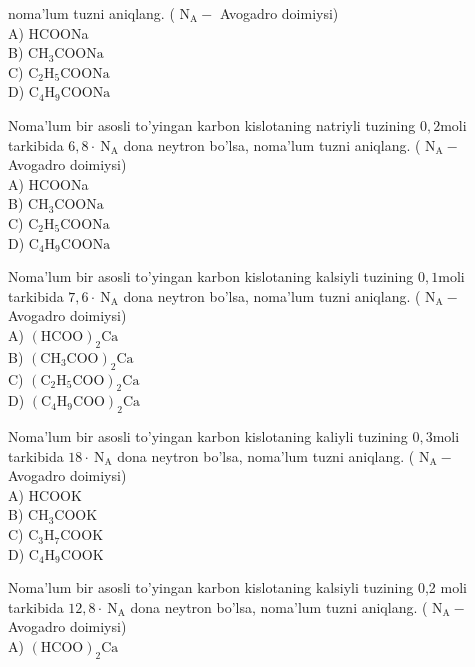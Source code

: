 noma'lum tuzni aniqlang. ( $\mathrm{N}_{\mathrm{A}}-$ Avogadro doimiysi)\\
A) HCOONa\\
B) $\mathrm{CH}_{3} \mathrm{COONa}$\\
C) $\mathrm{C}_{2} \mathrm{H}_{5} \mathrm{COONa}$\\
D) $\mathrm{C}_{4} \mathrm{H}_{9} \mathrm{COONa}$
  \item Noma'lum bir asosli to'yingan karbon kislotaning natriyli tuzining $0,2 \mathrm{moli}$ tarkibida $6,8 \cdot \mathrm{~N}_{\mathrm{A}}$ dona neytron bo'lsa, noma'lum tuzni aniqlang. ( $\mathrm{N}_{\mathrm{A}}-$ Avogadro doimiysi)\\
A) HCOONa\\
B) $\mathrm{CH}_{3} \mathrm{COONa}$\\
C) $\mathrm{C}_{2} \mathrm{H}_{5} \mathrm{COONa}$\\
D) $\mathrm{C}_{4} \mathrm{H}_{9} \mathrm{COONa}$
  \item Noma'lum bir asosli to'yingan karbon kislotaning kalsiyli tuzining $0,1 \mathrm{moli}$ tarkibida $7,6 \cdot \mathrm{~N}_{\mathrm{A}}$ dona neytron bo'lsa, noma'lum tuzni aniqlang. ( $\mathrm{N}_{\mathrm{A}}-$ Avogadro doimiysi)\\
A) $(\mathrm{HCOO})_{2} \mathrm{Ca}$\\
B) $\left(\mathrm{CH}_{3} \mathrm{COO}\right)_{2} \mathrm{Ca}$\\
C) $\left(\mathrm{C}_{2} \mathrm{H}_{5} \mathrm{COO}\right)_{2} \mathrm{Ca}$\\
D) $\left(\mathrm{C}_{4} \mathrm{H}_{9} \mathrm{COO}\right)_{2} \mathrm{Ca}$
  \item Noma'lum bir asosli to'yingan karbon kislotaning kaliyli tuzining $0,3 \mathrm{moli}$ tarkibida $18 \cdot \mathrm{~N}_{\mathrm{A}}$ dona neytron bo'lsa, noma'lum tuzni aniqlang. ( $\mathrm{N}_{\mathrm{A}}-$ Avogadro doimiysi)\\
A) HCOOK\\
B) $\mathrm{CH}_{3} \mathrm{COOK}$\\
C) $\mathrm{C}_{3} \mathrm{H}_{7} \mathrm{COOK}$\\
D) $\mathrm{C}_{4} \mathrm{H}_{9} \mathrm{COOK}$
  \item Noma'lum bir asosli to'yingan karbon kislotaning kalsiyli tuzining 0,2 moli tarkibida $12,8 \cdot \mathrm{~N}_{\mathrm{A}}$ dona neytron bo'lsa, noma'lum tuzni aniqlang. ( $\mathrm{N}_{\mathrm{A}}-$ Avogadro doimiysi)\\
A) $(\mathrm{HCOO})_{2} \mathrm{Ca}$\\
